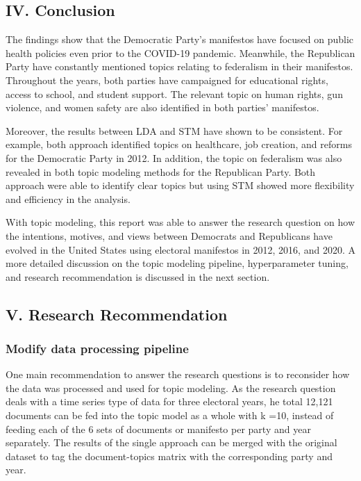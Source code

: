 \documentclass[
]{article}
\begin{document}
\hypertarget{iv.-conclusion}{%
\subsection{IV. Conclusion}\label{iv.-conclusion}}

The findings show that the Democratic Party's manifestos have focused on
public health policies even prior to the COVID-19 pandemic. Meanwhile,
the Republican Party have constantly mentioned topics relating to
federalism in their manifestos. Throughout the years, both parties have
campaigned for educational rights, access to school, and student
support. The relevant topic on human rights, gun violence, and women
safety are also identified in both parties' manifestos.

Moreover, the results between LDA and STM have shown to be consistent.
For example, both approach identified topics on healthcare, job
creation, and reforms for the Democratic Party in 2012. In addition, the
topic on federalism was also revealed in both topic modeling methods for
the Republican Party. Both approach were able to identify clear topics
but using STM showed more flexibility and efficiency in the analysis.

With topic modeling, this report was able to answer the research
question on how the intentions, motives, and views between Democrats and
Republicans have evolved in the United States using electoral manifestos
in 2012, 2016, and 2020. A more detailed discussion on the topic
modeling pipeline, hyperparameter tuning, and research recommendation is
discussed in the next section.

\hypertarget{v.-research-recommendation}{%
\subsection{V. Research
Recommendation}\label{v.-research-recommendation}}

\hypertarget{modify-data-processing-pipeline}{%
\subsubsection{Modify data processing
pipeline}\label{modify-data-processing-pipeline}}

One main recommendation to answer the research questions is to
reconsider how the data was processed and used for topic modeling. As
the research question deals with a time series type of data for three
electoral years, he total 12,121 documents can be fed into the topic
model as a whole with k =10, instead of feeding each of the 6 sets of
documents or manifesto per party and year separately. The results of the
single approach can be merged with the original dataset to tag the
document-topics matrix with the corresponding party and year.
\end{document}
